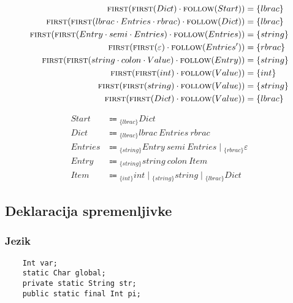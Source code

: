 \documentclass{report}
\newcommand{\Null}{\varepsilon}
\newcommand{\Seq}{\cdot}
\newcommand{\Spc}{\ }
\newcommand{\Union}{\mathrel{|}}
\newcommand{\FIRST}{\textsc{first}}
\newcommand{\FOLLOW}{\textsc{follow}}
\newcommand{\Arrow}{\Coloneq}
\newcommand{\NT}[1]{{#1}}
\newcommand{\T}[1]{{#1}}
\newcommand{\Lookahead}[1]{{}_{\{{#1}\}}}
\begin{document}
    \begin{equation*}
      \begin{aligned}
        \FIRST(\FIRST(\NT{Dict}) \Seq \FOLLOW(\NT{Start})) &= \{\T{lbrac}\}\\
        \FIRST(\FIRST(\T{lbrac} \Seq \NT{Entries} \Seq \T{rbrac}) \Seq \FOLLOW(\NT{Dict})) &= \{\T{lbrac}\}\\
        \FIRST(\FIRST(\NT{Entry} \Seq \T{semi} \Seq \NT{Entries}) \Seq \FOLLOW(\NT{Entries})) &= \{\T{string}\}\\
        \FIRST(\FIRST(\Null) \Seq \FOLLOW(\NT{Entries'})) &= \{\T{rbrac}\}\\
        \FIRST(\FIRST(\T{string} \Seq \T{colon} \Seq \NT{Value}) \Seq \FOLLOW(\NT{Entry})) &= \{\T{string}\}\\
        \FIRST(\FIRST(\T{int}) \Seq \FOLLOW(\NT{Value})) &= \{\T{int}\}\\
        \FIRST(\FIRST(\T{string}) \Seq \FOLLOW(\NT{Value})) &= \{\T{string}\}\\
        \FIRST(\FIRST(\T{Dict}) \Seq \FOLLOW(\NT{Value})) &= \{\T{lbrac}\}\\
      \end{aligned}
    \end{equation*}

    \begin{equation*}
      \begin{aligned}
        \NT{Start} &\Arrow \Lookahead{\T{lbrac}} \NT{Dict}\\
        \NT{Dict} &\Arrow \Lookahead{\T{lbrac}} \T{lbrac} \Spc \NT{Entries} \Spc \T{rbrac}\\
        \NT{Entries} &\Arrow \Lookahead{\T{string}} \NT{Entry} \Spc \T{semi} \Spc \NT{Entries} \Union \Lookahead{\T{rbrac}} \Null\\
        \NT{Entry} &\Arrow \Lookahead{\T{string}} \T{string} \Spc \T{colon} \Spc \NT{Item}\\
        \NT{Item} &\Arrow \Lookahead{\T{int}} \T{int} \Union \Lookahead{\T{string}} \T{string} \Union \Lookahead{\T{lbrac}} \NT{Dict}
      \end{aligned}
    \end{equation*}

    \subsection{Deklaracija spremenljivke}

    \subsubsection*{Jezik}
    \begin{verbatim}
    Int var;
    static Char global;
    private static String str;
    public static final Int pi;
    \end{verbatim}
\end{document}
